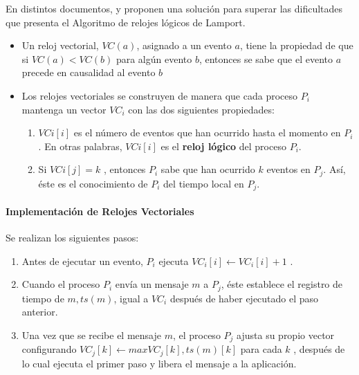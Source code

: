 		 En distintos documentos, \cite{Mattern1989} y \cite{Fidge1991} proponen  una solución para superar las dificultades que presenta el Algoritmo de relojes l\'ogicos de Lamport. 

		\begin{itemize} 
			\item  Un reloj vectorial, $VC(a)$, asignado a un evento $a$, tiene la propiedad de que si $ VC(a) < VC(b) $ para algún evento $ b$, entonces se sabe que el evento $a$ precede en causalidad al evento $b$
			\item  Los relojes vectoriales se construyen de manera que cada proceso  $P_{i}$ mantenga un vector $VC_{i}$ con las dos siguientes propiedades:
			
				\begin{enumerate}
					\item  $VCi[i]$ es el número de eventos que han ocurrido hasta el momento en $P_{i}$. En otras palabras, $	VCi[i] $ es el \textbf{reloj lógico} del proceso $P_{i}$.
					\item  Si $VCi[j] =  k$ , entonces $P_{i}$ sabe que han ocurrido $ k$ eventos en $P_{j}$. Así, éste es el conocimiento
					de $P_{i}$ del tiempo local en $P_{j}$.
				\end{enumerate}
		\end{itemize}		
				
		\paragraph{Implementaci\'on de 	Relojes Vectoriales}		
			 
		Se realizan los siguientes pasos:
					
	\begin{enumerate} 
		\item  Antes de ejecutar un evento,  $P_{i}$  ejecuta $VC_{i}[i] \leftarrow VC_{i}[i] + 1 $ .
		\item Cuando el proceso $P_{i}$ envía un mensaje $m$ a $P_{j}$, éste establece el registro de tiempo de
		$m, ts(m)$, igual a $VC_{i}$ después de haber ejecutado el paso anterior.
		\item Una vez que se recibe el mensaje $m$, el proceso $P_{j}$ ajusta su propio vector configurando
		$VC_{j}[k] \leftarrow max{VC_{j}[k],ts(m)[k]} $ para cada $k$ , después de lo cual ejecuta el primer 	paso y libera el mensaje a la aplicación.
	\end{enumerate}		
			 
